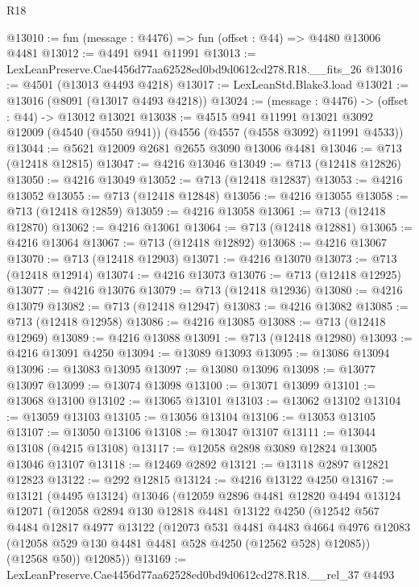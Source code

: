 \begin{lexlean}{R18}
\begin{coremodule}
@13010 := fun (message : @4476) => fun (offset : @44) => @4480 @13006 @4481
@13012 := @4491 @941 @11991
@13013 := LexLeanPreserve.Cae4456d77aa62528ed0bd9d0612cd278.R18.__fits_26
@13016 := @4501 (@13013 @4493 @4218)
@13017 := LexLeanStd.Blake3.load
@13021 := @13016 (@8091 (@13017 @4493 @4218))
@13024 := (message : @4476) -> (offset : @44) -> @13012 @13021
@13038 := @4515
    @941
    @11991
    @13021
    @3092
    @12009
    (@4540 (@4550 @941))
    (@4556 (@4557 (@4558 @3092) @11991 @4533))
@13044 := @5621 @12009 @2681 @2655 @3090 @13006 @4481
@13046 := @713 (@12418 @12815)
@13047 := @4216 @13046
@13049 := @713 (@12418 @12826)
@13050 := @4216 @13049
@13052 := @713 (@12418 @12837)
@13053 := @4216 @13052
@13055 := @713 (@12418 @12848)
@13056 := @4216 @13055
@13058 := @713 (@12418 @12859)
@13059 := @4216 @13058
@13061 := @713 (@12418 @12870)
@13062 := @4216 @13061
@13064 := @713 (@12418 @12881)
@13065 := @4216 @13064
@13067 := @713 (@12418 @12892)
@13068 := @4216 @13067
@13070 := @713 (@12418 @12903)
@13071 := @4216 @13070
@13073 := @713 (@12418 @12914)
@13074 := @4216 @13073
@13076 := @713 (@12418 @12925)
@13077 := @4216 @13076
@13079 := @713 (@12418 @12936)
@13080 := @4216 @13079
@13082 := @713 (@12418 @12947)
@13083 := @4216 @13082
@13085 := @713 (@12418 @12958)
@13086 := @4216 @13085
@13088 := @713 (@12418 @12969)
@13089 := @4216 @13088
@13091 := @713 (@12418 @12980)
@13093 := @4216 @13091 @4250
@13094 := @13089 @13093
@13095 := @13086 @13094
@13096 := @13083 @13095
@13097 := @13080 @13096
@13098 := @13077 @13097
@13099 := @13074 @13098
@13100 := @13071 @13099
@13101 := @13068 @13100
@13102 := @13065 @13101
@13103 := @13062 @13102
@13104 := @13059 @13103
@13105 := @13056 @13104
@13106 := @13053 @13105
@13107 := @13050 @13106
@13108 := @13047 @13107
@13111 := @13044 @13108 (@4215 @13108)
@13117 := @12058 @2898 @3089 @12824 @13005 @13046 @13107
@13118 := @12469 @2892
@13121 := @13118 @2897 @12821 @12823
@13122 := @292 @12815
@13124 := @4216 @13122 @4250
@13167 := @13121
    (@4495 @13124)
    @13046
    (@12059
      @2896
      @4481
      @12820
      @4494
      @13124
      @12071
      (@12058
        @2894
        @130
        @12818
        @4481
        @13122
        @4250
        (@12542
          @567
          @4484
          @12817
          @4977
          @13122
          (@12073
            @531
            @4481
            @4483
            @4664
            @4976
            @12083
            (@12058 @529 @130 @4481 @4481 @528 @4250 (@12562 @528) @12085))
          (@12568 @50))
        @12085))
@13169 := LexLeanPreserve.Cae4456d77aa62528ed0bd9d0612cd278.R18.__rel_37 @4493

\end{coremodule}
\end{lexlean}
